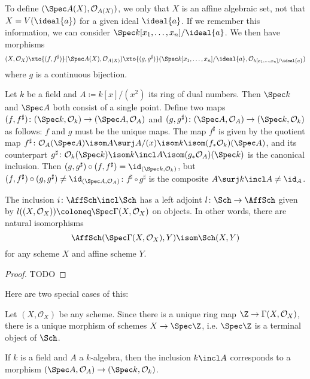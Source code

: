 \documentclass[wip, algebra]{bsteffan-lecturenotes}
\newcommand{\cO}{\mathcal{O}}
\begin{document}
\begin{remark}
	To define $(\Spec A(X), \cO_{A(X)})$, we only that $X$ is an affine algebraic set, not that $X = V(\ideal{a})$ for a given ideal $\ideal{a}$.
	If we remember this information, we can consider $\Spec k[x_1, \ldots, x_n] / \ideal{a}$.
	We then have morphisms
	\begin{equation*}
		(X, \cO_X) \xto{(f, f^\sharp)} (\Spec A(X), \cO_{A(X)}) \xto{(g, g^\sharp)} (\Spec k[x_1, \ldots, x_n] / \ideal{a}, \cO_{k[x_1, \ldots, x_n] / \ideal{a}})
	\end{equation*}
	where $g$ is a continuous bijection.
\end{remark}
\begin{example}
	Let $k$ be a field and $A \coloneq k[x] / (x^2)$ its ring of dual numbers.
	Then $\Spec k$ and $\Spec A$ both consist of a single point.
	Define two maps $(f, f^\sharp)\colon (\Spec k, \cO_{k}) \to (\Spec A, \cO_{A})$ and $(g, g^\sharp)\colon (\Spec A, \cO_{A}) \to (\Spec k, \cO_k)$ as follows:
	$f$ and $g$ must be the unique maps. 
	The map $f^\sharp$ is given by the quotient map $f^\sharp\colon \cO_A(\Spec A) \isom A \surj A / (x) \isom k \isom (f_* \cO_k)(\Spec A)$, and its counterpart $g^\sharp\colon \cO_k(\Spec k) \isom k \incl A \isom (g_* \cO_A)(\Spec k)$ is the canonical inclusion.
	Then $(g, g^\sharp) \circ (f, f^\sharp) = \id_{(\Spec k, \cO_k)}$, but $(f, f^\sharp) \circ (g, g^\sharp) \neq \id_{(\Spec A, \cO_A)}$: $f^\sharp \circ g^\sharp$ is the composite $A \surj k \incl A \neq \id_A$.
\end{example}
\begin{proposition}\label{prp:affinclleftadj}
	The inclusion $i\colon \AffSch \incl \Sch$ has a left adjoint $l\colon \Sch \to \AffSch$ given by $l((X, \cO_X)) \coloneq \Spec \Gamma(X, \cO_X)$ on objects.
	In other words, there are natural isomorphisms
	\begin{equation*}
		\AffSch(\Spec \Gamma(X, \cO_X), Y) \isom \Sch(X, Y)
	\end{equation*}
	for any scheme $X$ and affine scheme $Y$.
\end{proposition}
\begin{proof}
	TODO
\end{proof}
Here are two special cases of this:
\begin{example}
	\leavevmode
	\begin{alphanumerate}
		\item Let $(X, \cO_X)$ be any scheme.
			Since there is a unique ring map $\Z \to \Gamma(X, \cO_X)$, there is a unique morphism of schemes $X \to \Spec \Z$, i.e. $\Spec \Z$ is a terminal object of $\Sch$.
		\item If $k$ is a field and $A$ a $k$-algebra, then the inclusion $k \incl A$ corresponds to a morphism $(\Spec A, \cO_A) \to (\Spec k, \cO_k)$.
	\end{alphanumerate}
\end{example}
\end{document}

